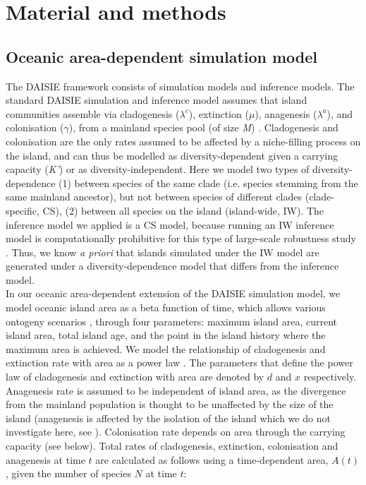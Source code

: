 \documentclass{article}
\begin{document}
\clearpage

\section*{Material and methods}

\subsection*{Oceanic area-dependent simulation model}

The DAISIE framework consists of simulation models and inference models. The standard DAISIE simulation and inference model assumes that island communities assemble via cladogenesis ($\lambda^c$), extinction ($\mu$), anagenesis ($\lambda^a$), and colonisation ($\gamma$), from a mainland species pool (of size \textit{M}) \citep{valente_equilibrium_2015}. Cladogenesis and colonisation are the only rates assumed to be affected by a niche-filling process on the island, and can thus be modelled as diversity-dependent given a carrying capacity (\textit{K’}) \citep{etienne_diversity-dependence_2012, valente_equilibrium_2015} or as diversity-independent. Here we model two types of diversity-dependence (1) between species of the same clade (i.e. species stemming from the same mainland ancestor), but not between species of different clades (clade-specific, CS), (2) between all species on the island (island-wide, IW). The inference model we applied is a CS model, because running an IW inference model is computationally prohibitive for this type of large-scale robustness study \citep{etienne_limits_2022}. Thus, we know \textit{a priori} that islands simulated under the IW model are generated under a diversity-dependence model that differs from the inference model.\\

In our oceanic area-dependent extension of the DAISIE simulation model, we model oceanic island area as a beta function of time, which allows various ontogeny scenarios \citep{valente_effects_2014}, through four parameters: maximum island area, current island area, total island age, and the point in the island history where the maximum area is achieved. We model the relationship of cladogenesis and extinction rate with area as a power law \citep{valente_simple_2020}. The parameters that define the power law of cladogenesis and extinction with area are denoted by $d$ and $x$ respectively. Anagenesis rate is assumed to be independent of island area, as the divergence from the mainland population is thought to be unaffected by the size of the island (anagenesis is affected by the isolation of the island which we do not investigate here, see \cite{valente_simple_2020}). Colonisation rate  depends on area through the carrying capacity (see below). Total rates of cladogenesis, extinction, colonisation and anagenesis at time $t$ are calculated as follows using a time-dependent area, $A(t)$, given the number of species $N$ at time $t$:
\end{document}
